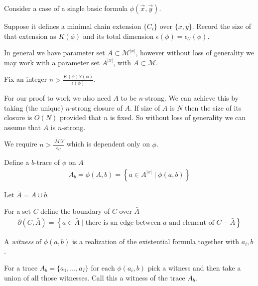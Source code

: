 \documentclass{amsart}
\newcommand{\MM}{\mathscr M}
\newcommand{\curly}[1]{\left\{#1\right\}}
\begin{document}


Consider a case of a single basic formula $\phi(\vec x, \vec y)$.

Suppose it defines a minimal chain extension $\{C_i\}$ over $\{x, y\}$. 
Record the size of that extension as $K(\phi)$ and its total dimension $\epsilon(\phi) = \epsilon_U(\phi)$.

In general we have parameter set $A \subset \MM^{|x|}$, however without loss of generality we may work with
a parameter set $A^{|x|}$, with $A \subset \MM$.

Fix an integer $n > \frac{K(\phi)Y(\phi)}{\epsilon(\phi)}$.

For our proof to work we also need $A$ to be $n$-strong.
We can achieve this by taking (the unique) $n$-strong closure of $A$.
If size of $A$ is $N$ then the size of its closure is $O(N)$ provided that $n$ is fixed.
So without loss of generality we can assume that $A$ is $n$-strong.

We require $n > \frac{|M|Y}{\epsilon_U}$ which is dependent only on $\phi$.

\begin{Definition}
	Define a $b$-trace of $\phi$ on $A$
	\begin{align*}
		A_b = \phi(A, b) = \curly{a \in A^{|x|} \mid \phi(a, b)}
	\end{align*}
\end{Definition}

Let $\bar A = A \cup b$. %

\begin{Definition}
	For a set $C$ define the boundary of $C$ over $\bar A$
	\begin{align*}
		\partial(C, \bar A) = \curly{a \in \bar A \mid \text{there is an edge between $a$ and element of $C - \bar A$}}
	\end{align*}
\end{Definition}

\begin{Definition}
	A \emph{witness} of $\phi(a, b)$ is a realization of the existential formula together with ${a_i, b}$.
\end{Definition}

\begin{Definition}
	For a trace $A_b = \{a_1, \ldots, a_I\}$ for each $\phi(a_i, b)$ pick a witness and then take a union of all those witnesses. Call this a witness of the trace $A_b$.	%
\end{Definition}
\end{document}

